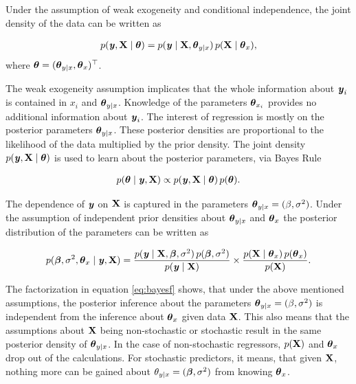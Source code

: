 \documentclass[11pt,a4paper,twoside]{book}\usepackage[]{graphicx}\usepackage[]{color}
\begin{document}
Under the assumption of weak exogeneity and conditional independence, the joint density of the data can be written as

       \begin{align*} 
p({\textbf{\textit{y}}}, {\mathbf{X}} \mid {\boldsymbol{\theta}}{}) = p({\textbf{\textit{y}}} \mid {\mathbf{X}}, {\boldsymbol{\theta}}{}_{y \mid x}) \, p({\mathbf{X}} \mid {\boldsymbol{\theta}}{}_{x}),
   \end{align*}
where ${\boldsymbol{\theta}}{} = ({\boldsymbol{\theta}}{}_{y \mid x}, {\boldsymbol{\theta}}{}_{x})^\top$. 

The weak exogeneity assumption implicates that the whole information about ${\textbf{\textit{y}}}_{i}$ is contained in $x_{i}$ and ${\boldsymbol{\theta}}{}_{y \mid x}$. Knowledge of the parameters ${\boldsymbol{\theta}}{}_{x_{i}}$ provides no additional information about ${\textbf{\textit{y}}}_{i}$.
The interest of regression is mostly on the posterior parameters ${\boldsymbol{\theta}}{}_{y \mid x}$. These posterior densities are proportional to the likelihood of the data  multiplied by the prior density. The joint density $p({\textbf{\textit{y}}}, {\mathbf{X}} \mid  {\boldsymbol{\theta}}{})$ is used to learn about the posterior parameters, via Bayes Rule

       \begin{align*} 
p({\boldsymbol{\theta}}{} \mid {\textbf{\textit{y}}}, {\mathbf{X}}) \propto p({\textbf{\textit{y}}}, {\mathbf{X}} \mid  {\boldsymbol{\theta}}{}) \, p({\boldsymbol{\theta}}{}).
   \end{align*}
   
   The dependence of ${\textbf{\textit{y}}}$ on ${\mathbf{X}}$ is captured in the parameters ${\boldsymbol{\theta}}{}_{y \mid x} = (\beta, \sigma^2)$. Under the assumption of independent prior densities about ${\boldsymbol{\theta}}{}_{y \mid x}$ and ${\boldsymbol{\theta}}{}_{x}$ the posterior distribution of the parameters can be written as
   
          \begin{align} 
p({\boldsymbol{\beta}}, \sigma^2, {\boldsymbol{\theta}}{}_{x} \mid {\textbf{\textit{y}}}, {\mathbf{X}}) = \frac{p({\textbf{\textit{y}}} \mid {\mathbf{X}}, {\boldsymbol{\beta}}, \sigma^2) \, p({\boldsymbol{\beta}}, \sigma^2)}{p({\textbf{\textit{y}}} \mid {\mathbf{X}})} \times \frac{p({\mathbf{X}} \mid {\boldsymbol{\theta}}{}_{x}) \, p({\boldsymbol{\theta}}{}_{x})}{p({\mathbf{X}})}.  \label{eq:bayesf} 
   \end{align}
   
  The factorization in equation \ref{eq:bayesf} shows, that under the above mentioned assumptions, the posterior inference about the parameters ${\boldsymbol{\theta}}{}_{y \mid x} = (\beta, \sigma^2)$ is independent from the inference about ${\boldsymbol{\theta}}{}_{x}$ given data ${\mathbf{X}}$. This also means that the assumptions about ${\mathbf{X}}$ being non-stochastic or stochastic result in the same posterior density of  ${\boldsymbol{\theta}}{}_{y \mid x}$. In the case of non-stochastic regressors, $p({\mathbf{X}})$ and ${\boldsymbol{\theta}}{}_{x}$ drop out of the calculations. For stochastic predictors, it means, that given ${\mathbf{X}}$, nothing more can be gained about $\theta_{y \mid x} = ({\boldsymbol{\beta}}, \sigma^2)$ from knowing ${\boldsymbol{\theta}}{}_{x}$. 
  
\end{document}

